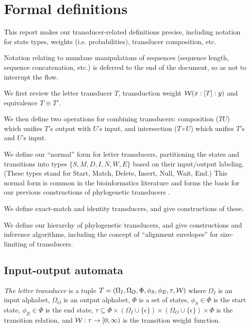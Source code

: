 \documentclass{article}
\newcommand{\seclabel}[1]{\label{sec.#1}}
\newcommand\gappedalphabet[1]{(\Omega_{#1} \cup \{\epsilon\})}
\newcommand\wtrans[4]{#1(#2 : [#3] : #4)}
\newcommand\transequiv{\equiv}
\newcommand\compose{}
\newcommand\fork{\circ}
\newcommand\States{\Phi}
\newcommand\Transitions{\tau}
\newcommand\startstate{\phi_S}
\newcommand\laststate{\phi_E}
\newcommand\weight{{\cal W}}
\begin{document}
\pagebreak
\section{Formal definitions}
\seclabel{Formal}
This report makes our transducer-related definitions precise,
 including notation for state types, weights (i.e. probabilities),
 transducer composition, etc.

Notation relating to mundane manipulations of sequences (sequence length, sequence concatenation, etc.) is deferred to the end of the document,
 so as not to interrupt the flow.

We first review the letter transducer $T$,
 transduction weight $\wtrans{\weight}{x}{T}{y}$ and
 equivalence $T \transequiv T'$.

We then define two operations for combining transducers:
 composition ($T \compose U$) which unifies $T$'s output with $U$'s input,
and
 intersection ($T \fork U$) which unifies $T$'s and $U$'s input.

We define our ``normal'' form for letter transducers,
 partitioning the states and transitions into types $\{S,M,D,I,N,W,E\}$ based on their input/output labeling.
(These types stand for Start, Match, Delete, Insert, Null, Wait, End.)
This normal form is common in the bioinformatics literature \cite{Durbin98}
 and forms the basis for our previous constructions of phylogenetic transducers \cite{Holmes2003,BradleyHolmes2009}.

We define exact-match and identity transducers, and give constructions of these.

We define our hierarchy of phylogenetic transducers, and give constructions and inference algorithms,
including the concept of ``alignment envelopes'' for size-limiting of transducers.

\subsection{Input-output automata}
\seclabel{Transducer}
{\em The letter transducer} is a tuple $T = (\Omega_I, \Omega_O, \States, \startstate, \laststate, \Transitions, \weight)$
where
 $\Omega_I$ is an input alphabet,
 $\Omega_O$ is an output alphabet,
$\States$ is a set of states,
$\startstate \in \States$ is the start state,
$\laststate \in \States$ is the end state,
$\Transitions \subseteq \States \times \gappedalphabet{I} \times \gappedalphabet{O} \times \States$ is the transition relation, and
$\weight:\Transitions \to [0,\infty)$ is the transition weight function.
\end{document}
